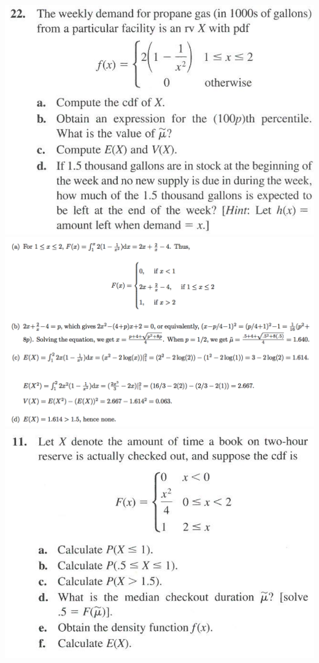 \documentclass[9pt]{extarticle}
\begin{document}
	\includegraphics[scale=0.25]{22.png}
	\includegraphics[scale=0.31]{22a.png} \includegraphics[scale=0.25]{11.png}
	
\end{document}
